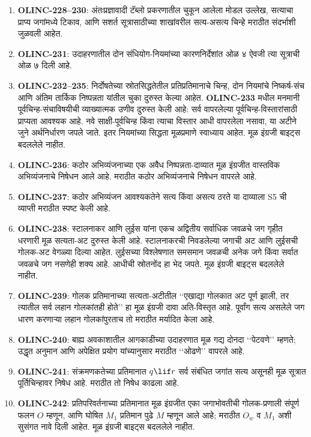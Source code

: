 \begin{enumerate}
\item \textbf{OLINC-228--230}: अंतःप्रज्ञावादी
टॅब्लो प्रकरणातील चुकून आलेला मोडल उल्लेख,
सत्याचा प्राप्य जगांमध्ये टिकाव, आणि
सशर्त सूत्रासाठीच्या शाखांवरील सत्य-असत्य
चिन्हे मराठीत संदर्भाशी जुळवली आहेत.
\item \textbf{OLINC-231}: उदाहरणातील
दोन संधियोग-नियमांच्या कारणनिर्देशांत
ओळ ४ ऐवजी त्या सूत्राची ओळ ७ दिली आहे.
\item \textbf{OLINC-232--235}: निर्दोषतेच्या
स्रोतसिद्धतेतील प्रतिप्रतिमानाचे चिन्ह,
दोन नियमांचे निष्कर्ष-संच आणि अंतिम
तार्किक निष्पन्नता यांतील चुका
दुरुस्त केल्या आहेत. \textbf{OLINC-233}
मधील मनमानी पूर्वचिन्ह-संचाविषयीची
व्याख्यात्मक उणीव दुरुस्त केली आहे:
सर्व वापरलेल्या पूर्वचिन्ह-विस्तारांसाठी
प्राप्यता आवश्यक आहे. नवे साक्षी-पूर्वचिन्ह
किंवा त्याचा विस्तार आधी वापरलेला नसावा,
या अटीने जुने अर्थनिर्धारण जपले जाते.
इतर नियमांच्या सिद्धता मूळप्रमाणे
स्वाध्याय आहेत. मूळ इंग्रजी बाइट्स
बदललेले नाहीत.

\item \textbf{OLINC-236}: कठोर अभिव्यंजनाच्या
एक अवैध निष्पन्नता-दाव्यात मूळ इंग्रजीत
वास्तविक अभिव्यंजनाचे निषेधन आले आहे.
मराठीत कठोर अभिव्यंजनाचे निषेधन वापरले आहे.
\item \textbf{OLINC-237}: कठोर अभिव्यंजन
आवश्यकतेने सत्य किंवा असत्य ठरते या दाव्याला
S5 ची व्याप्ती मराठीत स्पष्ट केली आहे.
\item \textbf{OLINC-238}: स्टालनाकर आणि
लुईस यांना एकच अद्वितीय सर्वाधिक जवळचे जग
गृहीत धरणारी मूळ सत्यता-अट दुरुस्त केली आहे.
स्टालनाकरची निवडलेल्या जगाची अट आणि
लुईसची गोलक-अट वेगळ्या दिल्या आहेत.
लुईसच्या विश्लेषणात समसमान जवळची अनेक जगे
किंवा सर्वात जवळचे जग नसणेही शक्य आहे.
आधीची स्रोतनोंद हा भेद जपते. मूळ इंग्रजी
बाइट्स बदललेले नाहीत.

\item \textbf{OLINC-239}: गोलक प्रतिमानाच्या
सत्यता-अटीतील ‘‘एखाद्या गोलकात
अट पूर्ण झाली, तर त्यातील
सर्व लहान गोलकांतही होते’’
हा मूळ इंग्रजी दावा अति-विस्तृत
आहे. पूर्वांग सत्य असलेले जग
धारण करणाऱ्या लहान गोलकांपुरताच
तो मराठीत मर्यादित केला आहे.
\item \textbf{OLINC-240}: बाह्य अवकाशातील
आगकाडीच्या उदाहरणात मूळ गद्य
दोनदा ‘‘पेटवणे’’ म्हणते; उद्धृत
अनुमान आणि अपेक्षित प्रयोग
यांच्यानुसार मराठीत ‘‘ओढणे’’
वापरले आहे.
\item \textbf{OLINC-241}: संक्रमणकतेच्या
प्रतिमानात \(q\lif r\) सर्व
संबंधित जगांत सत्य असूनही
मूळ सूत्रात पूर्तिचिन्हावर
निषेध आहे. मराठीत तो
निषेध काढला आहे.
\item \textbf{OLINC-242}: प्रतिपरिवर्तनाच्या
प्रतिमानात मूळ इंग्रजीत
एका जगाभोवतीची गोलक-प्रणाली
संपूर्ण फलन \(O\) म्हणून,
आणि घोषित \(M_1\) प्रतिमान
पुढे \(M\) म्हणून आले आहे;
मराठीत \(O_w\) व \(M_1\)
अशी सुसंगत नावे दिली आहेत.
मूळ इंग्रजी बाइट्स बदललेले नाहीत.


\end{enumerate}

